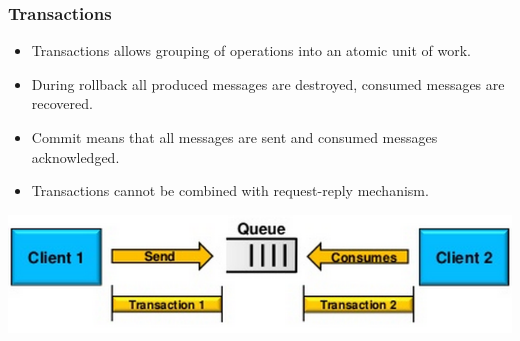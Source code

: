 \documentclass[10pt,xcolor=pdflatex]{beamer}
\begin{document}
\begin{frame}[containsverbatim]\frametitle{Transactions}
\begin{itemize}
	\item Transactions allows grouping of operations into an atomic unit of work.
	\item During rollback all produced messages are destroyed, consumed messages are recovered.
	\item Commit means that all messages are sent and consumed messages acknowledged.
	\item Transactions cannot be combined with request-reply mechanism.
\end{itemize}
\begin{center}
\includegraphics[scale=0.69]{img/obr8}
\end{center}
\end{frame}
\end{document}

